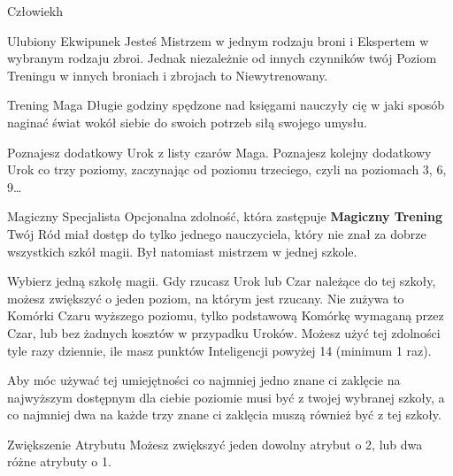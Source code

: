 \begin{race}{Człowiek}{h}
\begin{trait}{Ulubiony Ekwipunek}
		Jesteś Mistrzem w jednym rodzaju broni i Ekspertem w wybranym rodzaju
		zbroi. Jednak niezależnie od innych czynników twój Poziom Treningu w
		innych broniach i zbrojach to Niewytrenowany.
	\end{trait}

	\begin{trait}{Trening Maga}
		Długie godziny spędzone nad księgami nauczyły cię w jaki sposób naginać
		świat wokół siebie do swoich potrzeb siłą swojego umysłu.

		Poznajesz dodatkowy Urok z listy czarów Maga. Poznajesz kolejny
		dodatkowy Urok co trzy poziomy, zaczynając od poziomu trzeciego, czyli
		na poziomach 3, 6, 9\dots
	\end{trait}

	\begin{trait}{Magiczny
		Specjalista}
		Opcjonalna zdolność, która zastępuje {\bfseries Magiczny Trening}\\
		Twój Ród miał dostęp do tylko jednego nauczyciela, który nie znał za
		dobrze wszystkich szkół magii. Był natomiast mistrzem w jednej szkole.

		Wybierz jedną szkołę magii. Gdy rzucasz Urok lub Czar należące do tej
		szkoły, możesz zwiększyć o jeden poziom, na którym jest rzucany. Nie
		zużywa to Komórki Czaru wyższego poziomu, tylko podstawową Komórkę
		wymaganą przez Czar, lub bez żadnych kosztów w przypadku Uroków.
		Możesz użyć tej zdolności tyle razy dziennie, ile masz punktów
		Inteligencji powyżej 14 (minimum 1 raz).

		Aby móc używać tej umiejętności co najmniej jedno znane ci zaklęcie na
		najwyższym dostępnym dla ciebie poziomie musi być z twojej wybranej
		szkoły, a co najmniej dwa na każde trzy znane ci zaklęcia muszą również
		być z tej szkoły.
	\end{trait}

	\begin{trait}[Poziom 3, 7, 12 i 18]{Zwiększenie Atrybutu}
		Możesz zwiększyć jeden dowolny atrybut o 2, lub dwa różne atrybuty o 1.
	\end{trait}
\end{race}

